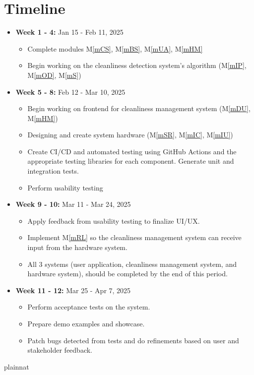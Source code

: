 \documentclass[12pt, titlepage]{article}
\newcommand{\mref}[1]{M\ref{#1}}
\begin{document}
\section{Timeline}
\begin{itemize}
\item \textbf{Week 1 - 4:} {Jan 15 - Feb 11, 2025}
\begin{itemize}
\item Complete modules \mref{mCS}, \mref{mBS}, \mref{mUA}, \mref{mHM}
\item Begin working on the cleanliness detection system's algorithm (\mref{mIP}, \mref{mOD}, \mref{mS})
\end{itemize}
\item \textbf{Week 5 - 8:} {Feb 12 - Mar 10, 2025}
\begin{itemize}
\item Begin working on frontend for cleanliness management system (\mref{mDU}, \mref{mHM})
\item Designing and create system hardware (\mref{mSR}, \mref{mIC}, \mref{mIU})
\item Create CI/CD and automated testing using GitHub Actions and the appropriate testing libraries for each component. Generate unit and integration tests.
\item Perform usability testing
\end{itemize}
\item \textbf{Week 9 - 10:} {Mar 11 - Mar 24, 2025}
\begin{itemize}
\item Apply feedback from usability testing to finalize UI/UX.
\item Implement \mref{mRL} so the cleanliness management system can receive input from the hardware system.
\item All 3 systems (user application, cleanliness management system, and hardware system), should be completed by the end of this period.
\end{itemize}
\item \textbf{Week 11 - 12:} {Mar 25 - Apr 7, 2025}
\begin{itemize}
\item Perform acceptance tests on the system.
\item Prepare demo examples and showcase.
\item Patch bugs detected from tests and do refinements based on user and stakeholder feedback.
\end{itemize}
\end{itemize}



 {plainnat}


\newpage{}
\end{document}
